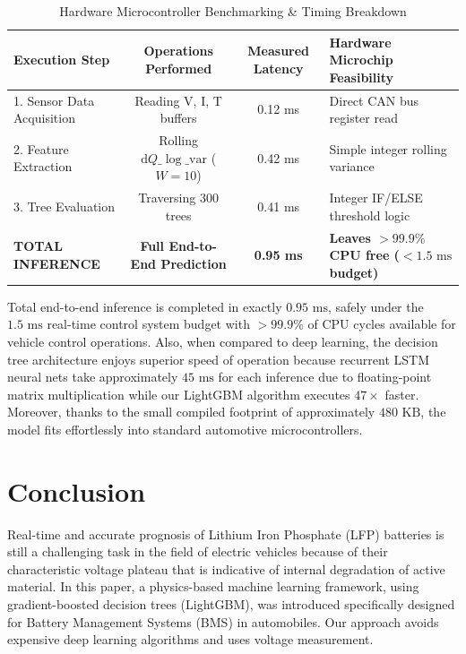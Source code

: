 \documentclass[pdflatex,sn-mathphys-num]{sn-jnl}%
\theoremstyle{thmstyleone}%
\theoremstyle{thmstyletwo}%
\theoremstyle{thmstylethree}%
\begin{document}
\begin{table}[ht!]
\centering
\caption{Hardware Microcontroller Benchmarking \& Timing Breakdown}\label{tab:mcu_timing}
\small
\begin{tabular}{@{}l c c p{3.5cm}@{}}
\toprule
\textbf{Execution Step} & \textbf{Operations Performed} & \textbf{Measured Latency} & \textbf{Hardware Microchip Feasibility} \\
\midrule
1. Sensor Data Acquisition & Reading V, I, T buffers & 0.12 ms & Direct CAN bus register read \\[1ex]
2. Feature Extraction & Rolling $\text{d}Q\_\log\_\text{var}$ ($W=10$) & 0.42 ms & Simple integer rolling variance \\[1ex]
3. Tree Evaluation & Traversing 300 trees & 0.41 ms & Integer IF/ELSE threshold logic \\[1ex]
\midrule
\textbf{TOTAL INFERENCE} & \textbf{Full End-to-End Prediction} & \textbf{0.95 ms} & \textbf{Leaves $>99.9\%$ CPU free ($<1.5\text{ ms}$ budget)} \\
\bottomrule
\end{tabular}
\end{table}

Total end-to-end inference is completed in exactly $0.95\text{ ms}$, safely under the $1.5\text{ ms}$ real-time control system budget with $>99.9\%$ of CPU cycles available for vehicle control operations. Also, when compared to deep learning, the decision tree architecture enjoys superior speed of operation because recurrent LSTM neural nets take approximately $45\text{ ms}$ for each inference due to floating-point matrix multiplication while our LightGBM algorithm executes $47\times$ faster. Moreover, thanks to the small compiled footprint of approximately $480\text{ KB}$, the model fits effortlessly into standard automotive microcontrollers.

\section{Conclusion}\label{sec13}

Real-time and accurate prognosis of Lithium Iron Phosphate (LFP) batteries is still a challenging task in the field of electric vehicles because of their characteristic voltage plateau that is indicative of internal degradation of active material. In this paper, a physics-based machine learning framework, using gradient-boosted decision trees (LightGBM), was introduced specifically designed for Battery Management Systems (BMS) in automobiles. Our approach avoids expensive deep learning algorithms and uses voltage measurement.
\end{document}
